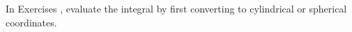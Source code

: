 {\noindent In Exercises} 
{,  evaluate the integral by first converting to cylindrical or spherical coordinates.}
